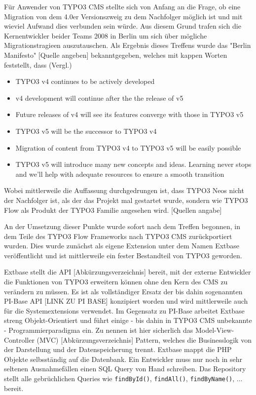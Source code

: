 Für Anwender von TYPO3 CMS stellte sich von Anfang an die Frage, ob eine Migration von dem 4.0er Versionszweig zu dem Nachfolger möglich ist und mit wieviel Aufwand dies verbunden sein würde. Aus diesem Grund trafen sich die Kernentwickler beider Teams 2008 in Berlin um sich über mögliche Migrationstragieen auszutauschen. Als Ergebnis dieses Treffens wurde das "Berlin Manifesto" [Quelle angeben] bekanntgegeben, welches mit kappen Worten feststellt, dass (Vergl.)
\begin{itemize} 
	\item TYPO3 v4 continues to be actively developed
	\item v4 development will continue after the the release of v5
	\item Future releases of v4 will see its features converge with those in TYPO3 v5
	\item TYPO3 v5 will be the successor to TYPO3 v4
	\item Migration of content from TYPO3 v4 to TYPO3 v5 will be easily possible
	\item TYPO3 v5 will introduce many new concepts and ideas. Learning never stops and we'll help with adequate resources to ensure a smooth transition
\end{itemize}

Wobei mittlerweile die Auffassung durchgedrungen ist, dass TYPO3 Neos nicht der Nachfolger ist, als der das Projekt mal gestartet wurde, sondern wie TYPO3 Flow als Produkt der TYPO3 Familie angesehen wird. [Quellen angabe]

An der Umsetzung dieser Punkte wurde sofort nach dem Treffen begonnen, in dem Teile des TYPO3 Flow Frameworks nach TYPO3 CMS zurückportiert wurden. Dies wurde zunächst als eigene Extension unter dem Namen Extbase veröffentlicht und ist mittlerweile ein fester Bestandteil von TYPO3 geworden. 

Extbase stellt die API [Abkürzungsverzeichnis] bereit, mit der externe Entwickler die Funktionen von TYPO3 erweitern können ohne den Kern des CMS zu verändern zu müssen. Es ist als vollständiger Ersatz der bis dahin sogenannten PI-Base API [LINK ZU PI BASE] konzipiert worden und wird mittlerweile auch für die Systemextensions verwendet. Im Gegensatz zu PI-Base arbeitet Extbase streng Objekt-Orientiert und führt einige - bis dahin in TYPO3 CMS unbekannte - Programmierparadigma ein. Zu nennen ist hier sicherlich das Model-View-Controller (MVC) [Abkürzungsverzeichnis] Pattern, welches die Businesslogik von der Darstellung und der Datenspeicherung trennt. Extbase mappt die PHP Objekte selbsständig auf die Datenbank. Ein Entwickler muss nur noch in sehr seltenen Ausnahmefällen einen SQL Query von Hand schreiben. Das Repository stellt alle gebrüchlichen Queries wie \texttt{findById()}, \texttt{findAll()}, \texttt{findByName()}, ... bereit. 


